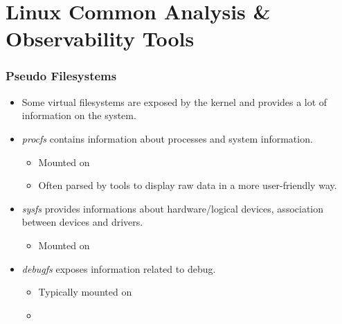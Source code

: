\section{Linux Common Analysis \& Observability Tools}

\begin{frame}
  \frametitle{Pseudo Filesystems}
  \begin{itemize}
    \item Some virtual filesystems are exposed by the kernel and provides a lot
          of information on the system.
    \item {\em procfs} contains information about processes and system
          information.
    \begin{itemize}
      \item Mounted on 
      \item Often parsed by tools to display raw data in a more user-friendly
            way.
    \end{itemize}
    \item {\em sysfs} provides informations about hardware/logical devices,
          association between devices and drivers.
    \begin{itemize}
      \item Mounted on 
    \end{itemize}
    \item {\em debugfs} exposes information related to debug.
    \begin{itemize}
      \item Typically mounted on 
      \item {}
    \end{itemize}
  \end{itemize}
\end{frame}

